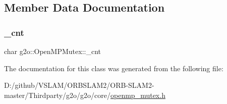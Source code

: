 \subsection{Member Data Documentation}
\mbox{\label{classg2o_1_1_open_m_p_mutex_a0cb363393694ee0dd15f822fbda7645a}} 
\subsubsection{\texorpdfstring{\+\_\+cnt}{\_cnt}}
{\footnotesize\ttfamily char g2o\+::\+Open\+M\+P\+Mutex\+::\+\_\+cnt\hspace{0.3cm}{\ttfamily [protected]}}



The documentation for this class was generated from the following file\+:\begin{DoxyCompactItemize}
\item 
D\+:/github/\+V\+S\+L\+A\+M/\+O\+R\+B\+S\+L\+A\+M2/\+O\+R\+B-\/\+S\+L\+A\+M2-\/master/\+Thirdparty/g2o/g2o/core/\mbox{\hyperlink{openmp__mutex_8h}{openmp\+\_\+mutex.\+h}}\end{DoxyCompactItemize}
